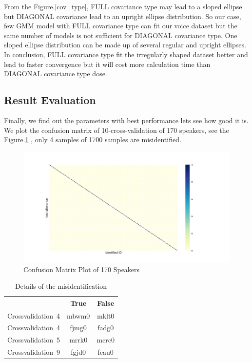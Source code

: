 \documentclass[12pt,DIV14,BCOR12mm,a4paper,footinclude=false,headinclude,parskip=half-,twoside,openright,cleardoublepage=empty,toc=index,bibliography=totoc,listof=totoc]{scrreprt}
\numberwithin{equation}{chapter}
\begin{document}
From the Figure.\ref{cov_type}, FULL covariance type may lead to a sloped ellipse but DIAGONAL covariance lead to an upright ellipse distribution. So our case, few GMM model with FULL covariance type can fit our voice dataset but the same number of models is not sufficient for DIAGONAL covariance type. One sloped ellipse distribution can be made up of several regular and upright ellipses. In conclusion, FULL covariance type fit the irregularly shaped dataset better and lead to faster convergence but it will cost more calculation time than DIAGONAL covariance type dose.

\subsection{Result Evaluation}
Finally, we find out the parameters with best performance lets see how good it is. We plot the confusion matrix of 10-cross-validation of 170 speakers, see the Figure.\ref{con_mat} , only 4 samples of 1700 samples are misidentified. 

\begin{figure}
	\centering
	\includegraphics[scale=0.3]{image/confusion_matrix}
	\caption{Confusion Matrix Plot of 170 Speakers}
	\label{con_mat}
\end{figure}

\begin{table}
	\centering
	\caption{Details of the misidentification}
	\label{misid}
	\begin{tabular}{lcc}
		\toprule
		& True & False  \\
		\midrule
		Crossvalidation\ 4 & mbwm0 & mklt0 \\
		Crossvalidation\ 4 & fjmg0 & fadg0 \\
		Crossvalidation\ 5 & mrrk0 & mcrc0 \\
		Crossvalidation\ 9 & fgjd0 & fcau0 \\
		\bottomrule
	\end{tabular}
\end{table}
\end{document}
